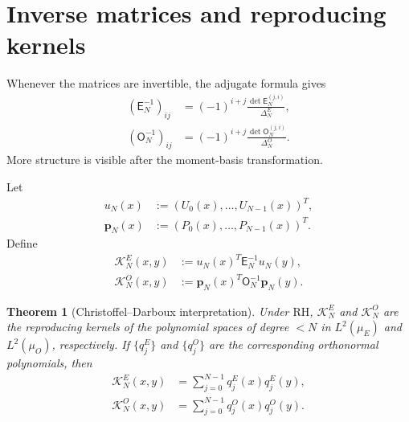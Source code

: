 \documentclass[11pt]{amsart}
\numberwithin{equation}{section}
\theoremstyle{plain}
\newtheorem{theorem}{Theorem}[section]
\theoremstyle{definition}
\theoremstyle{remark}
\newcommand{\RH}{\mathrm{RH}}
\newcommand{\E}{\mathsf E}
\newcommand{\Omat}{\mathsf O}
\begin{document}
\section{Inverse matrices and reproducing kernels}
\label{sec:inverse}

Whenever the matrices are invertible, the adjugate formula gives
\begin{align}
(\E_N^{-1})_{ij}
&=(-1)^{i+j}\frac{\det \E_N^{(j,i)}}{\Delta_N^E},
\label{eq:E_inverse_adjugate}\\
(\Omat_N^{-1})_{ij}
&=(-1)^{i+j}\frac{\det \Omat_N^{(j,i)}}{\Delta_N^O}.
\label{eq:O_inverse_adjugate}
\end{align}
More structure is visible after the moment-basis transformation.

Let
\begin{align}
u_N(x)&:=(U_0(x),\dots,U_{N-1}(x))^T,
\label{eq:uN_vector}\\
\mathbf p_N(x)&:=(P_0(x),\dots,P_{N-1}(x))^T.
\label{eq:pN_vector}
\end{align}
Define
\begin{align}
\mathcal K_N^E(x,y)
&:=u_N(x)^T\E_N^{-1}u_N(y),
\label{eq:KE_definition}\\
\mathcal K_N^O(x,y)
&:=\mathbf p_N(x)^T\Omat_N^{-1}\mathbf p_N(y).
\label{eq:KO_definition}
\end{align}

\begin{theorem}[Christoffel--Darboux interpretation]
\label{thm:inverse_CD}
Under $\RH$, $\mathcal K_N^E$ and $\mathcal K_N^O$ are the reproducing kernels of the polynomial spaces of degree $<N$ in $L^2(\mu_E)$ and $L^2(\mu_O)$, respectively. If $\{q_j^E\}$ and $\{q_j^O\}$ are the corresponding orthonormal polynomials, then
\begin{align}
\mathcal K_N^E(x,y)&=\sum_{j=0}^{N-1}q_j^E(x)q_j^E(y),
\label{eq:KE_orthonormal_sum}\\
\mathcal K_N^O(x,y)&=\sum_{j=0}^{N-1}q_j^O(x)q_j^O(y).
\label{eq:KO_orthonormal_sum}
\end{align}
\end{theorem}
\end{document}
